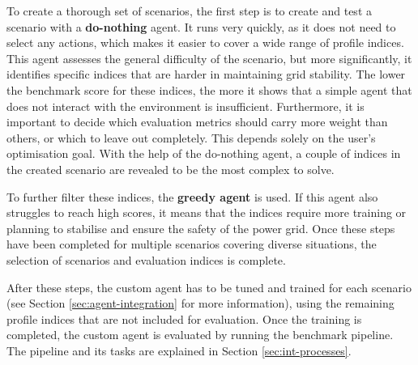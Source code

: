 To create a thorough set of scenarios, the first step is to create and test a scenario with a \textbf{do-nothing} agent. It runs very quickly, as it does not need to select any actions, which makes it easier to cover a wide range of profile indices. This agent assesses the general difficulty of the scenario, but more significantly, it identifies specific indices that are harder in maintaining grid stability. The lower the benchmark score for these indices, the more it shows that a simple agent that does not interact with the environment is insufficient. Furthermore, it is important to decide which evaluation metrics should carry more weight than others, or which to leave out completely. This depends solely on the user's optimisation goal. With the help of the do-nothing agent, a couple of indices in the created scenario are revealed to be the most complex to solve. 

To further filter these indices, the \textbf{greedy agent} is used. If this agent also struggles to reach high scores, it means that the indices require more training or planning to stabilise and ensure the safety of the power grid. Once these steps have been completed for multiple scenarios covering diverse situations, the selection of scenarios and evaluation indices is complete.

After these steps, the custom agent has to be tuned and trained for each scenario (see Section \ref{sec:agent-integration} for more information), using the remaining profile indices that are not included for evaluation. Once the training is completed, the custom agent is evaluated by running the benchmark pipeline. The pipeline and its tasks are explained in Section \ref{sec:int-processes}.